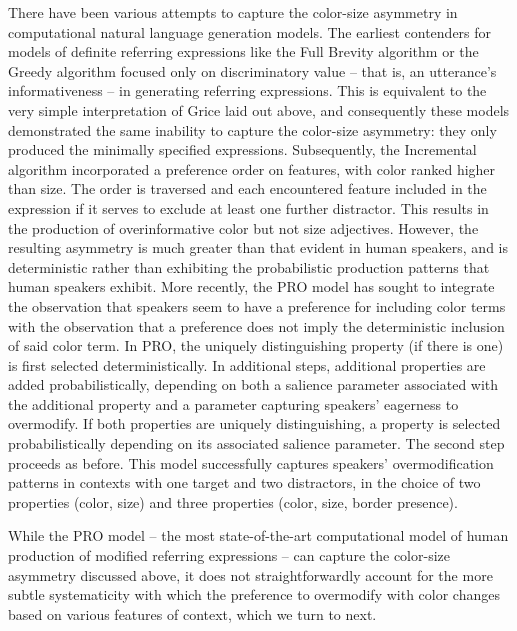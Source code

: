 \documentclass[11pt]{article}
\newcommand{\jd}[1]{\textcolor{Red}{[jd: #1]}}
\begin{document}

There have been various attempts to capture the color-size asymmetry in computational natural language generation models. The earliest contenders for models of definite referring expressions like the Full Brevity algorithm \cite{Dale1989} or the Greedy algorithm \cite{Dale1989} focused only on discriminatory value -- that is, an utterance's informativeness -- in generating referring expressions. This is equivalent to the very simple interpretation of Grice laid out above, and consequently these models demonstrated the same inability to capture the color-size asymmetry: they only produced the minimally specified expressions. Subsequently, the Incremental algorithm \cite{dale1995} incorporated a preference order on features, with color ranked higher than size. The order is traversed and each encountered feature included in the expression if it serves to exclude at least one further distractor. This results in the production of overinformative color but not size adjectives. However, the resulting asymmetry is much greater than that evident in human speakers, and is deterministic rather than exhibiting the probabilistic production patterns that human speakers exhibit. More recently, the PRO model \cite{VanGompel2019} has sought to integrate the observation that speakers seem to have a preference for including color terms with the observation that a preference does not imply the deterministic inclusion of said color term. In PRO, the uniquely distinguishing property (if there is one) is  first selected deterministically. In additional steps, additional properties are added probabilistically, depending on both a salience parameter associated with the additional property and a parameter capturing speakers' eagerness to overmodify. If both properties are uniquely distinguishing, a property is selected probabilistically depending on its associated salience parameter. The second step proceeds as before. This model successfully captures speakers' overmodification patterns in contexts with one target and two distractors, in the choice of two properties (color, size) and three properties (color, size, border presence).

While the PRO model -- the most state-of-the-art computational model of human production of modified referring expressions -- can capture the color-size asymmetry discussed above, it does not straightforwardly  account for the more subtle systematicity with which the preference to overmodify with color changes based on various features of context, which we turn to next. 
\end{document}
